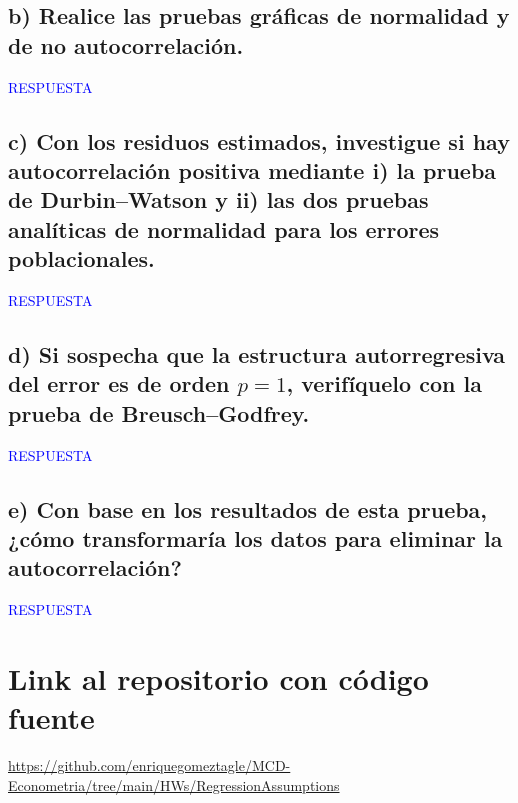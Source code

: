 \documentclass[10pt]{article}
\begin{document}
\subsection{b) Realice las pruebas gráficas de normalidad y de no autocorrelación.}
\textcolor{blue}{RESPUESTA}

\subsection{c) Con los residuos estimados, investigue si hay autocorrelación positiva mediante i) la prueba de Durbin--Watson y ii) las dos pruebas analíticas de normalidad para los errores poblacionales.}
\textcolor{blue}{RESPUESTA}

\subsection{d) Si sospecha que la estructura autorregresiva del error es de orden \texorpdfstring{$p=1$}{p=1}, verifíquelo con la prueba de Breusch--Godfrey.}
\textcolor{blue}{RESPUESTA}

\subsection{e) Con base en los resultados de esta prueba, ¿cómo transformaría los datos para eliminar la autocorrelación?}
\textcolor{blue}{RESPUESTA}
\section{Link al repositorio con código fuente}
\url{https://github.com/enriquegomeztagle/MCD-Econometria/tree/main/HWs/RegressionAssumptions}
\end{document}
